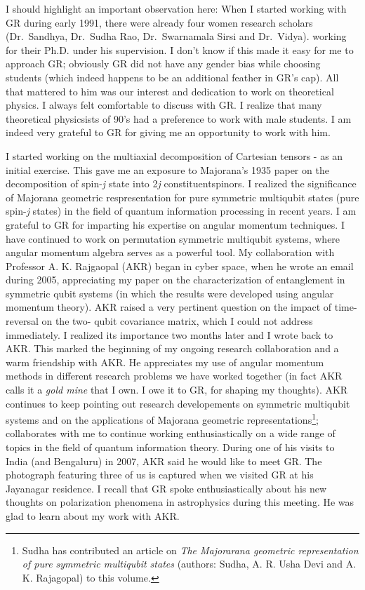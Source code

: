 I should highlight an important observation here: When I started working with GR during early 1991, there were already four women research scholars (Dr.\ Sandhya, Dr.\ Sudha Rao, Dr.\ Swarnamala Sirsi and Dr.\ Vidya). working for their Ph.D. under his supervision. I don't know if this made it easy for me to approach GR; obviously GR did not have any gender bias while choosing students (which indeed happens to be an additional feather in GR's cap). All that mattered to him was our interest and dedication to work on theoretical physics. I always felt comfortable to discuss with GR. I realize that many theoretical physicsists of 90's had a preference to work with male students. I am indeed very grateful to GR for giving me an opportunity to work with him.
\vskip 2pt

I started working on the multiaxial decomposition of Cartesian tensors - as an initial exercise. This gave me an exposure to Majorana's 1935 paper on the decomposition of spin-\textit{j} state into 2\textit{j} constituent\break spinors. I realized the significance of Majorana geometric respresentation for pure symmetric multiqubit states (pure spin-\textit{j} states) in the field of quantum information processing in recent years. I am grateful to GR for imparting his expertise on angular momentum techniques. I have continued to work on permutation symmetric multiqubit systems, where angular momentum algebra serves as a powerful tool. My collaboration with Professor A. K. Rajgaopal (AKR) began in cyber space, when he wrote an email during 2005, appreciating my paper on the characterization of entanglement in symmetric qubit systems (in which the results were developed using angular momentum theory). AKR raised a very pertinent question on the impact of time-reversal on the two- qubit covariance matrix, which I could not address immediately. I realized its importance two months later and I wrote back to AKR. This marked the beginning of my ongoing research collaboration and a warm friendship with AKR. He appreciates my use of angular momentum methods in different research problems we have worked together (in fact AKR calls it a \textit{gold mine} that I own. I owe it to GR, for shaping my thoughts). AKR continues to keep pointing out research developements on symmetric multiqubit systems and on the applications of Majorana geometric representations\footnote{Sudha has contributed an article on \textit{The Majorarana  geometric representation of pure symmetric multiqubit states} (authors: Sudha, A. R. Usha Devi and A. K. Rajagopal) to this volume.}; collaborates with me to continue working enthusiastically on a wide range of topics in the field of quantum information theory. During one of his visits to India (and Bengaluru) in 2007, AKR said he would like to meet GR. The photograph featuring three of us is captured when we visited GR at his Jayanagar residence. I recall that GR spoke enthusiastically about his new thoughts on polarization phenomena in astrophysics during this meeting. He was glad to learn about my work with AKR.


